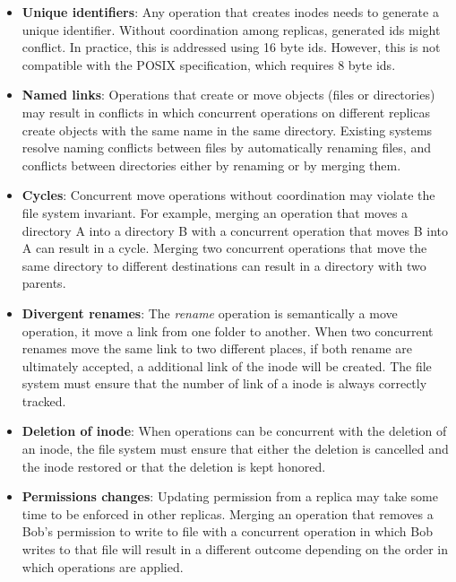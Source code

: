 \documentclass[sigconf, anonymous, 10pt]{acmart}
\begin{document}
\begin{itemize}
	\item \textbf{Unique identifiers}: Any operation that creates
	inodes needs to generate a unique identifier.
	Without coordination among replicas, generated ids might conflict.
	In practice, this is addressed using 16 byte ids.
	However, this is not compatible with the POSIX specification, which requires 8 byte ids.
	\item \textbf{Named links}: Operations that create or move objects (files or directories)
	may result in conflicts in which concurrent operations on different replicas create
	objects with the same name in the same directory.
	Existing systems resolve naming conflicts between files by automatically renaming
  files, and conflicts between directories either by renaming or by merging them.
    \item \textbf{Cycles}: Concurrent move operations without coordination may violate the file system invariant.
    For example, merging an operation that moves a directory A into a
	directory B with a concurrent operation that moves B into A can result in a cycle.
    Merging two concurrent operations that move the same directory to different destinations can result in a directory with two parents.
  \item \textbf{Divergent renames}: The \textit{rename} operation is semantically a move operation, it move a link from one folder to another. When two concurrent renames move the same link to two different places, if both rename are ultimately accepted, a additional link of the inode will be created. The file system must ensure that the number of link of a inode is always correctly tracked.
  \item \textbf{Deletion of inode}: When operations can be concurrent with the deletion of an inode, the file system
  must ensure that either the deletion is cancelled and the inode restored or that the deletion is kept honored.
  \item \textbf{Permissions changes}: Updating permission from a replica may take some time to be enforced in other replicas.
  Merging an operation that removes a Bob's permission to write to file with a concurrent operation in which Bob writes
  to that file will result in a different outcome depending on the order in which operations are applied.
\end{itemize}
\end{document}

